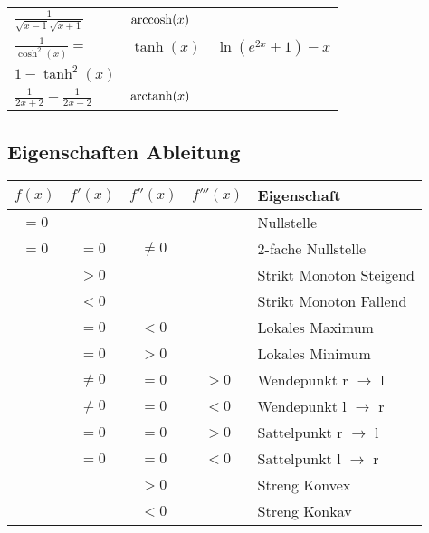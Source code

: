 \begin{tabular}{l | l | l}
    $\frac{1}{\sqrt{x-1}\sqrt{x+1}}$                                 & $\operatorname{arccosh}(x)$           & \\
    $\frac{1}{\cosh^2(x)} =$                                         & $\tanh(x)$              & $\ln(e^{2x} + 1) - x$\\
    $1 - \tanh^2(x)$                                                 &                         & \\
    $\frac{1}{2x+2} - \frac{1}{2x - 2}$                              & $\operatorname{arctanh}(x)$           & \\
\end{tabular}


\subsection{Eigenschaften Ableitung}
\begin{tabular}{c | c | c | c | l}
    $f(x)$            & $f'(x)$  & $f''(x)$ & $ f'''(x)$ & Eigenschaft\\\hline
    $= 0$             &          &          &            & Nullstelle\\\hline
    $= 0$             & $= 0$    & $\neq 0$ &            & $2$-fache Nullstelle\\\hline
                      & $> 0$    &          &            & Strikt Monoton Steigend\\\hline
                      & $< 0$    &          &            & Strikt Monoton Fallend\\\hline
                      & $= 0$    & $< 0$    &            & Lokales Maximum\\\hline
                      & $= 0$    & $> 0$    &            & Lokales Minimum\\\hline
                      & $\neq 0$ & $= 0$    & $> 0$      & Wendepunkt r $\to$ l\\\hline
                      & $\neq 0$ & $= 0$    & $< 0$      & Wendepunkt l $\to$ r\\\hline
                      & $= 0$    & $= 0$    & $> 0$      & Sattelpunkt r $\to$ l\\\hline
                      & $= 0$    & $= 0$    & $< 0$      & Sattelpunkt l $\to$ r\\\hline
                      &          & $> 0$    &            & Streng Konvex\\\hline
                      &          & $< 0$    &            & Streng Konkav\\\hline
\end{tabular}

